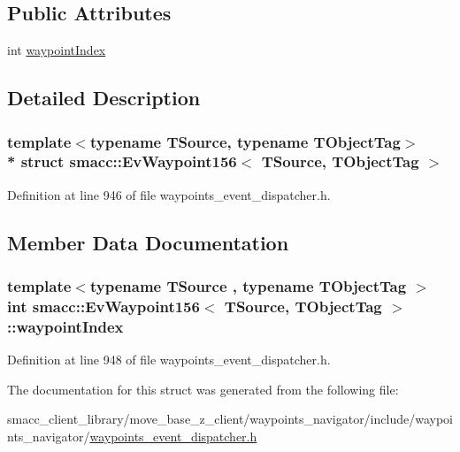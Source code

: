 \subsection*{Public Attributes}
\begin{DoxyCompactItemize}
\item 
int \hyperlink{structsmacc_1_1EvWaypoint156_a16ab83a5f4d0ace8b21ab65bf937a886}{waypoint\+Index}
\end{DoxyCompactItemize}


\subsection{Detailed Description}
\subsubsection*{template$<$typename T\+Source, typename T\+Object\+Tag$>$\\*
struct smacc\+::\+Ev\+Waypoint156$<$ T\+Source, T\+Object\+Tag $>$}



Definition at line 946 of file waypoints\+\_\+event\+\_\+dispatcher.\+h.



\subsection{Member Data Documentation}
\subsubsection[{\texorpdfstring{waypoint\+Index}{waypointIndex}}]{\setlength{\rightskip}{0pt plus 5cm}template$<$typename T\+Source , typename T\+Object\+Tag $>$ int {\bf smacc\+::\+Ev\+Waypoint156}$<$ T\+Source, T\+Object\+Tag $>$\+::waypoint\+Index}\hypertarget{structsmacc_1_1EvWaypoint156_a16ab83a5f4d0ace8b21ab65bf937a886}{}\label{structsmacc_1_1EvWaypoint156_a16ab83a5f4d0ace8b21ab65bf937a886}


Definition at line 948 of file waypoints\+\_\+event\+\_\+dispatcher.\+h.



The documentation for this struct was generated from the following file\+:\begin{DoxyCompactItemize}
\item 
smacc\+\_\+client\+\_\+library/move\+\_\+base\+\_\+z\+\_\+client/waypoints\+\_\+navigator/include/waypoints\+\_\+navigator/\hyperlink{waypoints__event__dispatcher_8h}{waypoints\+\_\+event\+\_\+dispatcher.\+h}\end{DoxyCompactItemize}
